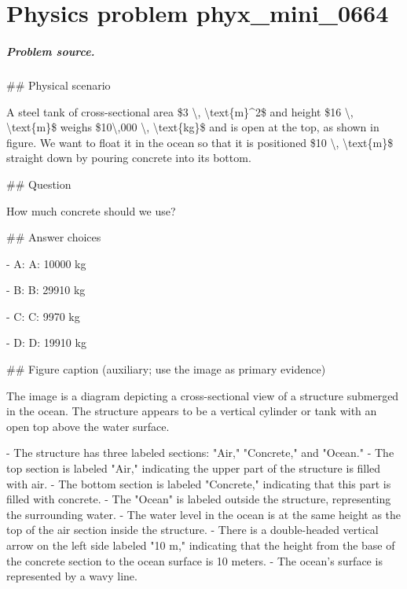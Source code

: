 
\chapter{Physics problem phyx\_mini\_0664}
\label{ch:PhyXMiniProblems_problem_phyx_mini_0664}

\paragraph{Problem source.}
\#\# Physical scenario

A steel tank of cross-sectional area \$3 \textbackslash{}, \textbackslash{}text\{m\}\textasciicircum{}2\$ and height \$16 \textbackslash{}, \textbackslash{}text\{m\}\$ weighs \$10\textbackslash{},000 \textbackslash{}, \textbackslash{}text\{kg\}\$ and is open at the top, as shown in figure. We want to float it in the ocean so that it is positioned \$10 \textbackslash{}, \textbackslash{}text\{m\}\$ straight down by pouring concrete into its bottom.

\#\# Question

How much concrete should we use?

\#\# Answer choices

- A: A: 10000 kg

- B: B: 29910 kg

- C: C: 9970 kg

- D: D: 19910 kg

\#\# Figure caption (auxiliary; use the image as primary evidence)

The image is a diagram depicting a cross-sectional view of a structure submerged in the ocean. The structure appears to be a vertical cylinder or tank with an open top above the water surface.

- The structure has three labeled sections: "Air," "Concrete," and "Ocean."
- The top section is labeled "Air," indicating the upper part of the structure is filled with air.
- The bottom section is labeled "Concrete," indicating that this part is filled with concrete.
- The "Ocean" is labeled outside the structure, representing the surrounding water.
- The water level in the ocean is at the same height as the top of the air section inside the structure.
- There is a double-headed vertical arrow on the left side labeled "10 m," indicating that the height from the base of the concrete section to the ocean surface is 10 meters.
- The ocean's surface is represented by a wavy line. 

